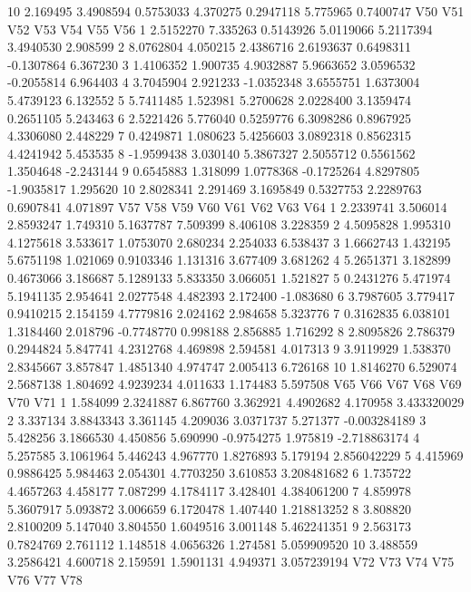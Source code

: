\documentclass[12pt]{article}
\begin{document}
\begin{Schunk}
\begin{Soutput}
10 2.169495  3.4908594 0.5753033 4.370275 0.2947118  5.775965 0.7400747
          V50      V51        V52        V53       V54        V55       V56
1   2.5152270 7.335263  0.5143926  5.0119066 5.2117394  3.4940530  2.908599
2   8.0762804 4.050215  2.4386716  2.6193637 0.6498311 -0.1307864  6.367230
3   1.4106352 1.900735  4.9032887  5.9663652 3.0596532 -0.2055814  6.964403
4   3.7045904 2.921233 -1.0352348  3.6555751 1.6373004  5.4739123  6.132552
5   5.7411485 1.523981  5.2700628  2.0228400 3.1359474  0.2651105  5.243463
6   2.5221426 5.776040  0.5259776  6.3098286 0.8967925  4.3306080  2.448229
7   0.4249871 1.080623  5.4256603  3.0892318 0.8562315  4.4241942  5.453535
8  -1.9599438 3.030140  5.3867327  2.5055712 0.5561562  1.3504648 -2.243144
9   0.6545883 1.318099  1.0778368 -0.1725264 4.8297805 -1.9035817  1.295620
10  2.8028341 2.291469  3.1695849  0.5327753 2.2289763  0.6907841  4.071897
         V57      V58       V59      V60        V61      V62      V63       V64
1  2.2339741 3.506014 2.8593247 1.749310  5.1637787 7.509399 8.406108  3.228359
2  4.5095828 1.995310 4.1275618 3.533617  1.0753070 2.680234 2.254033  6.538437
3  1.6662743 1.432195 5.6751198 1.021069  0.9103346 1.131316 3.677409  3.681262
4  5.2651371 3.182899 0.4673066 3.186687  5.1289133 5.833350 3.066051  1.521827
5  0.2431276 5.471974 5.1941135 2.954641  2.0277548 4.482393 2.172400 -1.083680
6  3.7987605 3.779417 0.9410215 2.154159  4.7779816 2.024162 2.984658  5.323776
7  0.3162835 6.038101 1.3184460 2.018796 -0.7748770 0.998188 2.856885  1.716292
8  2.8095826 2.786379 0.2944824 5.847741  4.2312768 4.469898 2.594581  4.017313
9  3.9119929 1.538370 2.8345667 3.857847  1.4851340 4.974747 2.005413  6.726168
10 1.8146270 6.529074 2.5687138 1.804692  4.9239234 4.011633 1.174483  5.597508
        V65       V66      V67      V68        V69      V70          V71
1  1.584099 2.3241887 6.867760 3.362921  4.4902682 4.170958  3.433320029
2  3.337134 3.8843343 3.361145 4.209036  3.0371737 5.271377 -0.003284189
3  5.428256 3.1866530 4.450856 5.690990 -0.9754275 1.975819 -2.718863174
4  5.257585 3.1061964 5.446243 4.967770  1.8276893 5.179194  2.856042229
5  4.415969 0.9886425 5.984463 2.054301  4.7703250 3.610853  3.208481682
6  1.735722 4.4657263 4.458177 7.087299  4.1784117 3.428401  4.384061200
7  4.859978 5.3607917 5.093872 3.006659  6.1720478 1.407440  1.218813252
8  3.808820 2.8100209 5.147040 3.804550  1.6049516 3.001148  5.462241351
9  2.563173 0.7824769 2.761112 1.148518  4.0656326 1.274581  5.059909520
10 3.488559 3.2586421 4.600718 2.159591  1.5901131 4.949371  3.057239194
         V72       V73        V74       V75        V76        V77      V78

\end{Soutput}
\end{Schunk}
\end{document}

